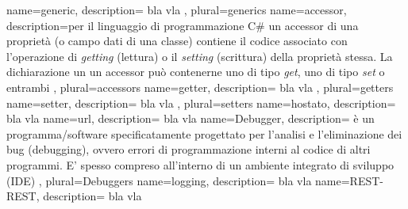  {
	name=generic,
	description={ bla vla %
	},
	plural=generics
}
 {
	name=accessor,
	description={per il linguaggio di programmazione C\# un accessor di una proprietà (o campo dati di una classe) contiene il codice associato con l'operazione di \textit{getting} (lettura) o il \textit{setting} (scrittura) della proprietà stessa. La dichiarazione un un accessor può contenerne uno di tipo \textit{get}, uno di tipo \textit{set} o entrambi
	},
	plural=accessors
}
 {
	name=getter,
	description={ bla vla %
	},
	plural=getters
}
 {
	name=setter,
	description={ bla vla %
	},
	plural=setters
}
 {
	name=hostato,
	description={ bla vla %
	}
}
 {
	name=url,
	description={ bla vla %
	}
}
 {
	name=Debugger,
	description={ è un programma/software specificatamente progettato per l'analisi e l'eliminazione dei bug (debugging), ovvero errori di programmazione interni al codice di altri programmi. E' spesso compreso all'interno di un ambiente integrato di sviluppo (IDE)
	},
	plural=Debuggers
}
 {
	name=logging,
	description={ bla vla %
	}
}
 {
	name=REST-REST,
	description={ bla vla %
	}
}



















